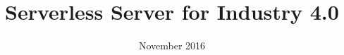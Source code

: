 \documentclass[a4paper,20pt,oneside]{book}
\begin{document}
\title{\Huge{\bfseries{Serverless Server for Industry 4.0}}}
\author{}
\date{November 2016}
\maketitle
\clearpage


\tableofcontents
\end{document}
